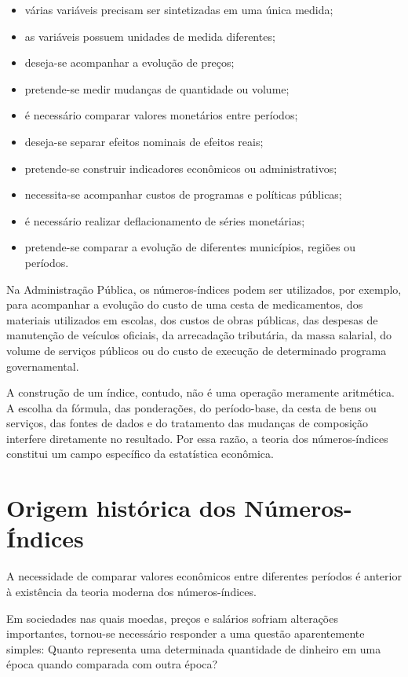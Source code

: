 \begin{itemize}
    \item várias variáveis precisam ser sintetizadas em uma única medida;
    \item as variáveis possuem unidades de medida diferentes;
    \item deseja-se acompanhar a evolução de preços;
    \item pretende-se medir mudanças de quantidade ou volume;
    \item é necessário comparar valores monetários entre períodos;
    \item deseja-se separar efeitos nominais de efeitos reais;
    \item pretende-se construir indicadores econômicos ou administrativos;
    \item necessita-se acompanhar custos de programas e políticas públicas;
    \item é necessário realizar deflacionamento de séries monetárias;
    \item pretende-se comparar a evolução de diferentes municípios, regiões ou períodos.
\end{itemize}

Na Administração Pública, os números-índices podem ser utilizados, por exemplo, para acompanhar a evolução do custo de uma cesta de medicamentos, dos materiais utilizados em escolas, dos custos de obras públicas, das despesas de manutenção de veículos oficiais, da arrecadação tributária, da massa salarial, do volume de serviços públicos ou do custo de execução de determinado programa governamental.\vskip0.3cm

A construção de um índice, contudo, não é uma operação meramente aritmética. A escolha da fórmula, das ponderações, do período-base, da cesta de bens ou serviços, das fontes de dados e do tratamento das mudanças de composição interfere diretamente no resultado. Por essa razão, a teoria dos números-índices constitui um campo específico da estatística econômica.

\newpage
\section{Origem histórica dos Números-Índices}

A necessidade de comparar valores econômicos entre diferentes períodos é anterior à existência da teoria moderna dos números-índices. \vskip0.3cm

Em sociedades nas quais moedas, preços e salários sofriam alterações importantes, tornou-se necessário responder a uma questão aparentemente simples: Quanto representa uma determinada quantidade de dinheiro em uma época quando comparada com outra época? \vskip0.3cm


